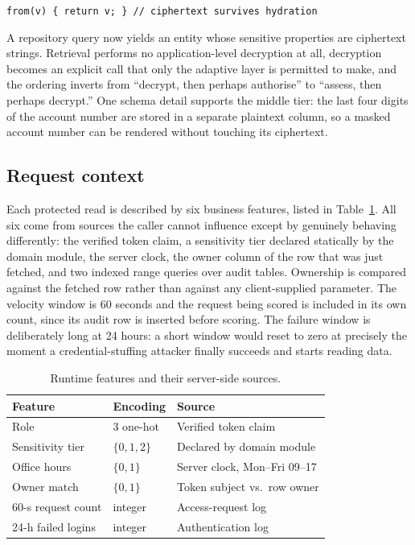 \documentclass[a4paper,conference]{IEEEtran}
\begin{document}
\begin{center}
\small
\texttt{from(v) \{ return v; \} \quad // ciphertext survives hydration}
\end{center}

A repository query now yields an entity whose sensitive properties are ciphertext strings.
Retrieval performs no application-level decryption at all, decryption becomes an explicit call
that only the adaptive layer is permitted to make, and the ordering inverts from ``decrypt, then
perhaps authorise'' to ``assess, then perhaps decrypt.'' One schema detail supports the middle
tier: the last four digits of the account number are stored in a separate plaintext column, so a
masked account number can be rendered without touching its ciphertext.

\subsection{Request context}

Each protected read is described by six business features, listed in Table~\ref{tab:features}.
All six come from sources the caller cannot influence except by genuinely behaving differently:
the verified token claim, a sensitivity tier declared statically by the domain module, the server
clock, the owner column of the row that was just fetched, and two indexed range queries over
audit tables. Ownership is compared against the fetched row rather than against any
client-supplied parameter. The velocity window is 60 seconds and the request being scored is
included in its own count, since its audit row is inserted before scoring. The failure window is
deliberately long at 24 hours: a short window would reset to zero at precisely the moment a
credential-stuffing attacker finally succeeds and starts reading data.

\begin{table}[t]
\caption{Runtime features and their server-side sources.}
\label{tab:features}
\centering
\footnotesize
\begin{tabular}{@{}lll@{}}
\toprule
Feature & Encoding & Source \\
\midrule
Role & 3 one-hot & Verified token claim \\
Sensitivity tier & $\{0,1,2\}$ & Declared by domain module \\
Office hours & $\{0,1\}$ & Server clock, Mon--Fri 09--17 \\
Owner match & $\{0,1\}$ & Token subject vs.\ row owner \\
60-s request count & integer & Access-request log \\
24-h failed logins & integer & Authentication log \\
\bottomrule
\end{tabular}
\end{table}
\end{document}
